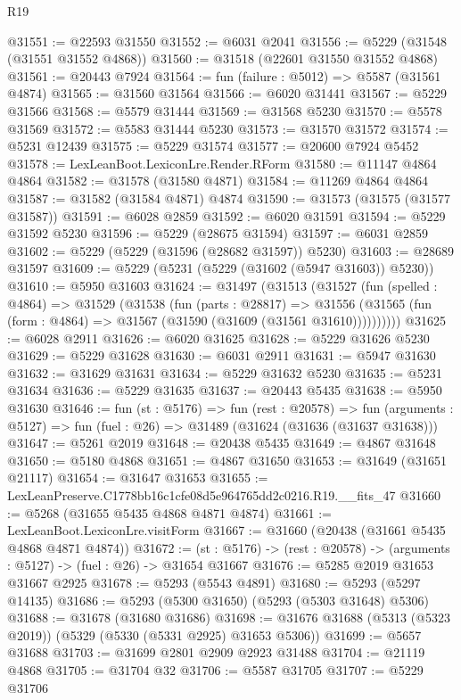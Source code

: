 \begin{lexlean}{R19}
\begin{coremodule}
@31551 := @22593 @31550
@31552 := @6031 @2041
@31556 := @5229 (@31548 (@31551 @31552 @4868))
@31560 := @31518 (@22601 @31550 @31552 @4868)
@31561 := @20443 @7924
@31564 := fun (failure : @5012) => @5587 (@31561 @4874)
@31565 := @31560 @31564
@31566 := @6020 @31441
@31567 := @5229 @31566
@31568 := @5579 @31444
@31569 := @31568 @5230
@31570 := @5578 @31569
@31572 := @5583 @31444 @5230
@31573 := @31570 @31572
@31574 := @5231 @12439
@31575 := @5229 @31574
@31577 := @20600 @7924 @5452
@31578 := LexLeanBoot.LexiconLre.Render.RForm
@31580 := @11147 @4864 @4864
@31582 := @31578 (@31580 @4871)
@31584 := @11269 @4864 @4864
@31587 := @31582 (@31584 @4871) @4874
@31590 := @31573 (@31575 (@31577 @31587))
@31591 := @6028 @2859
@31592 := @6020 @31591
@31594 := @5229 @31592 @5230
@31596 := @5229 (@28675 @31594)
@31597 := @6031 @2859
@31602 := @5229 (@5229 (@31596 (@28682 @31597)) @5230)
@31603 := @28689 @31597
@31609 := @5229 (@5231 (@5229 (@31602 (@5947 @31603)) @5230))
@31610 := @5950 @31603
@31624 := @31497
    (@31513
      (@31527
        (fun (spelled : @4864) =>
        @31529
          (@31538
            (fun (parts : @28817) =>
            @31556 (@31565 (fun (form : @4864) => @31567 (@31590 (@31609 (@31561 @31610))))))))))
@31625 := @6028 @2911
@31626 := @6020 @31625
@31628 := @5229 @31626 @5230
@31629 := @5229 @31628
@31630 := @6031 @2911
@31631 := @5947 @31630
@31632 := @31629 @31631
@31634 := @5229 @31632 @5230
@31635 := @5231 @31634
@31636 := @5229 @31635
@31637 := @20443 @5435
@31638 := @5950 @31630
@31646 := fun (st : @5176) =>
  fun (rest : @20578) =>
  fun (arguments : @5127) => fun (fuel : @26) => @31489 (@31624 (@31636 (@31637 @31638)))
@31647 := @5261 @2019
@31648 := @20438 @5435
@31649 := @4867 @31648
@31650 := @5180 @4868
@31651 := @4867 @31650
@31653 := @31649 (@31651 @21117)
@31654 := @31647 @31653
@31655 := LexLeanPreserve.C1778bb16c1cfe08d5e964765dd2c0216.R19.__fits_47
@31660 := @5268 (@31655 @5435 @4868 @4871 @4874)
@31661 := LexLeanBoot.LexiconLre.visitForm
@31667 := @31660 (@20438 (@31661 @5435 @4868 @4871 @4874))
@31672 := (st : @5176) -> (rest : @20578) -> (arguments : @5127) -> (fuel : @26) -> @31654 @31667
@31676 := @5285 @2019 @31653 @31667 @2925
@31678 := @5293 (@5543 @4891)
@31680 := @5293 (@5297 @14135)
@31686 := @5293 (@5300 @31650) (@5293 (@5303 @31648) @5306)
@31688 := @31678 (@31680 @31686)
@31698 := @31676 @31688 (@5313 (@5323 @2019)) (@5329 (@5330 (@5331 @2925) @31653 @5306))
@31699 := @5657 @31688
@31703 := @31699 @2801 @2909 @2923 @31488
@31704 := @21119 @4868
@31705 := @31704 @32
@31706 := @5587 @31705
@31707 := @5229 @31706

\end{coremodule}
\end{lexlean}
